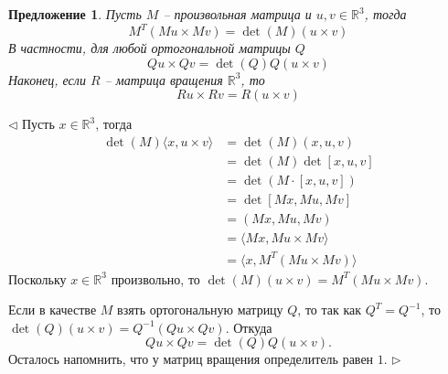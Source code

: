 \documentclass[12pt]{article}
\newtheorem{proposition}[theorem]{Предложение}
\newenvironment{proof}{\par $\triangleleft$}{$\triangleright$}
\begin{document}
\begin{proposition}
    Пусть $M$ -- произвольная матрица и $u,v\in\mathbb{R}^3$, тогда
    $$
        M^T(M u\times M v)=\det(M) (u \times v)
    $$
    В частности, для любой ортогональной матрицы $Q$
    $$
        Qu\times Qv=\det(Q) Q(u\times v)
    $$
    Наконец, если $R$ -- матрица вращения $\mathbb{R}^3$, то
    \begin{equation}\label{eq:1}
        Ru\times Rv=R(u\times v)
    \end{equation}
\end{proposition}
\begin{proof}
    Пусть $x\in\mathbb{R}^3$, тогда
    $$
        \begin{aligned}
            \det(M)\langle x, u\times v\rangle
             & =\det(M)(x,u,v)                      \\
             & =\det(M)\det[x,u,v]                  \\
             & =\det(M\cdot [x,u,v])                \\
             & =\det[Mx,Mu,Mv]                      \\
             & =(Mx,Mu,Mv)                          \\
             & =\langle Mx, Mu\times Mv\rangle      \\
             & =\langle x, M^T(Mu \times Mv)\rangle
        \end{aligned}
    $$
    Поскольку $x\in\mathbb{R}^3$
    произвольно, то $\det(M) (u\times v)=M^T(Mu\times Mv)$.

    Если в качестве $M$ взять ортогональную матрицу $Q$, то так как $Q^T=Q^{-1}$,
    то $\det(Q)(u\times v)=Q^{-1}(Qu\times Qv)$. Откуда
    $$
        Qu\times Qv=\det(Q) Q(u\times v).
    $$
    Осталось напомнить, что у матриц вращения определитель равен $1$.
\end{proof}
\end{document}
